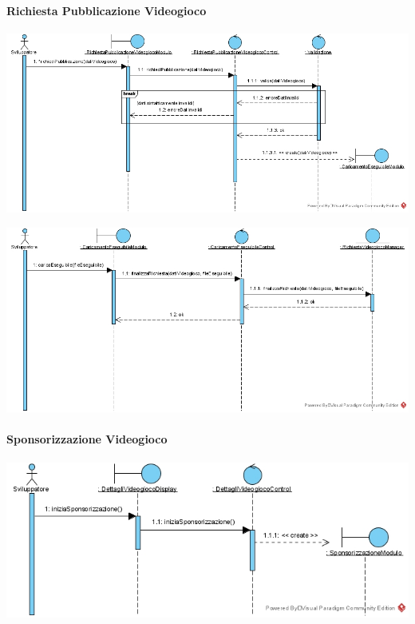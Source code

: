 \newpage
\paragraph{Richiesta Pubblicazione Videogioco}
\begin{center}
\includegraphics[width=\textwidth,height=\textheight,keepaspectratio]{Figure/SequenceDiagrams/RichiestaPubblicazioneVideogiocoStep1.jpg}
\end{center}

\begin{center}
\includegraphics[width=\textwidth,height=\textheight,keepaspectratio]{Figure/SequenceDiagrams/RichiestaPubblicazioneVideogiocoStep2.jpg}
\end{center}

\newpage
\paragraph{Sponsorizzazione Videogioco}
\begin{center}
\includegraphics[width=\textwidth,height=\textheight,keepaspectratio]{Figure/SequenceDiagrams/SponsorizzazioneVideogiocoEntry.jpg}
\end{center}

